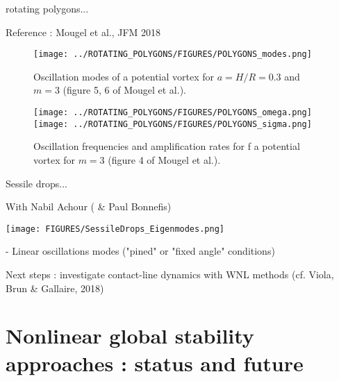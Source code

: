 \documentclass{beamer}
\begin{document}
\begin{frame}{rotating polygons...}

\begin{description}
\item{Reference :} Mougel et al., JFM 2018 
\end{description}

\begin{figure}
\texttt{[image: ../ROTATING\_POLYGONS/FIGURES/POLYGONS\_modes.png]}
\caption{Oscillation modes of a potential vortex for  $a=H/R=0.3$ and $m=3$ (figure 5, 6 of Mougel et al.).}
\label{Bridges_NV_Eigenmodes_phi_cyl_L3_5}
\end{figure}

\begin{figure}
\texttt{[image: ../ROTATING\_POLYGONS/FIGURES/POLYGONS\_omega.png]}
\texttt{[image: ../ROTATING\_POLYGONS/FIGURES/POLYGONS\_sigma.png]}
\caption{Oscillation frequencies and amplification rates for f a potential vortex for $m=3$ (figure 4 of Mougel et al.).}
\label{Bridges_NV_Eigenmodes_phi_cyl_L3_5}
\end{figure}
 
\end{frame}

\begin{frame}{Sessile drops...}

With Nabil Achour  ( \& Paul Bonnefis)

\texttt{[image: FIGURES/SessileDrops\_Eigenmodes.png]}     %

- Linear oscillations modes ("pined" or "fixed angle" conditions)

Next steps : investigate contact-line dynamics with WNL methods (cf. Viola, Brun \& Gallaire, 2018)

\end{frame}




\section{Nonlinear global stability approaches : status and future}
\end{document}
